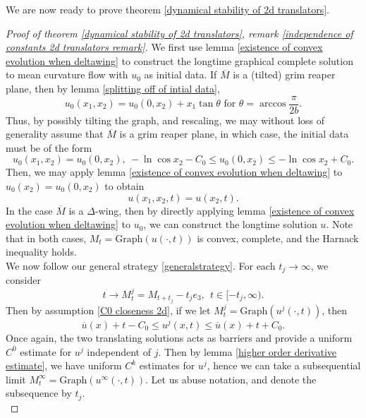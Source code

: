 \documentclass[pdflatex,sn-mathphys-num]{sn-jnl}%
\begin{document}
We are now ready to prove theorem \ref{dynamical stability of 2d translators}.
\begin{proof}[Proof of theorem \ref{dynamical stability of 2d translators}, remark \ref{independence of constants 2d translators remark}]
We first use lemma \ref{existence of convex evolution when deltawing} to construct the longtime graphical complete solution to mean curvature flow with $u_0$ as initial data. If $\overline{M}$ is a (tilted) grim reaper plane, then by lemma \ref{splitting off of intial data}, 
\begin{equation}
    u_0(x_1,x_2) = u_0(0, x_2) + x_1\tan\theta \text{ for }\theta = \arccos\frac{\pi}{2b}. 
\end{equation}
Thus, by possibly tilting the graph, and rescaling, we may without loss of generality assume that $\overline{M}$ is a grim reaper plane, in which case, the initial data must be of the form
\begin{equation}
    u_0(x_1,x_2) = u_0(0,x_2), \ -\ln \cos x_2 - C_0 \leq u_0(0, x_2) \leq -\ln\cos x_2 + C_0.
\end{equation}
Then, we may apply lemma \ref{existence of convex evolution when deltawing} to $u_0(x_2) = u_0(0, x_2)$ to obtain
\begin{equation}
    u(x_1,x_2,t) = u(x_2,t).
\end{equation}
In the case $\overline{M}$ is a $\Delta$-wing, then by directly applying lemma \ref{existence of convex evolution when deltawing} to $u_0$, we can construct the longtime solution $u$. Note that in both cases, $M_t = \text{Graph}(u(\cdot, t))$ is convex, complete, and the Harnack inequality holds. \\

We now follow our general strategy \ref{generalstrategy}. For each $t_j \to \infty$, we consider 
\begin{equation}
    t \to M^j_t = M_{t + t_j} - t_je_3, \ \ t \in [-t_j, \infty).
\end{equation}
Then by assumption \eqref{C0 closeness 2d}, if we let $M^j_t = \text{Graph}(u^j(\cdot, t))$, then
\begin{equation}\label{C0 closeness of limit flow 2d}
    \overline{u}(x) + t - C_0 \leq u^j(x, t) \leq \overline{u}(x) + t + C_0.
\end{equation}
Once again, the two translating solutions acts as barriers and provide a uniform $C^0$ estimate for $u^j$ independent of $j$. Then by lemma \ref{higher order derivative estimate}, we have uniform $C^k$ estimates for $u^j$, hence we can take a subsequential limit $M^{\infty}_t = \text{Graph}(u^{\infty}(\cdot, t))$. Let us abuse notation, and denote the subsequence by $t_j$.\\


\end{proof}
\end{document}

